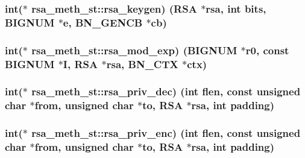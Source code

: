 \subsubsection[{\texorpdfstring{rsa\+\_\+keygen}{rsa_keygen}}]{\setlength{\rightskip}{0pt plus 5cm}int($\ast$ rsa\+\_\+meth\+\_\+st\+::rsa\+\_\+keygen) ({\bf R\+SA} $\ast$rsa, int {\bf bits}, {\bf B\+I\+G\+N\+UM} $\ast$e, {\bf B\+N\+\_\+\+G\+E\+N\+CB} $\ast${\bf cb})}\hypertarget{structrsa__meth__st_a08d964380b9ca4fd0d7664fe0d14dfd0}{}\label{structrsa__meth__st_a08d964380b9ca4fd0d7664fe0d14dfd0}
\subsubsection[{\texorpdfstring{rsa\+\_\+mod\+\_\+exp}{rsa_mod_exp}}]{\setlength{\rightskip}{0pt plus 5cm}int($\ast$ rsa\+\_\+meth\+\_\+st\+::rsa\+\_\+mod\+\_\+exp) ({\bf B\+I\+G\+N\+UM} $\ast$r0, const {\bf B\+I\+G\+N\+UM} $\ast$I, {\bf R\+SA} $\ast$rsa, {\bf B\+N\+\_\+\+C\+TX} $\ast$ctx)}\hypertarget{structrsa__meth__st_a055a4194b3a73d653111656553b2ae8c}{}\label{structrsa__meth__st_a055a4194b3a73d653111656553b2ae8c}
\subsubsection[{\texorpdfstring{rsa\+\_\+priv\+\_\+dec}{rsa_priv_dec}}]{\setlength{\rightskip}{0pt plus 5cm}int($\ast$ rsa\+\_\+meth\+\_\+st\+::rsa\+\_\+priv\+\_\+dec) (int flen, const unsigned char $\ast$from, unsigned char $\ast$to, {\bf R\+SA} $\ast$rsa, int padding)}\hypertarget{structrsa__meth__st_a0a9fcf9d1e4799ab69233c2187921fe1}{}\label{structrsa__meth__st_a0a9fcf9d1e4799ab69233c2187921fe1}
\subsubsection[{\texorpdfstring{rsa\+\_\+priv\+\_\+enc}{rsa_priv_enc}}]{\setlength{\rightskip}{0pt plus 5cm}int($\ast$ rsa\+\_\+meth\+\_\+st\+::rsa\+\_\+priv\+\_\+enc) (int flen, const unsigned char $\ast$from, unsigned char $\ast$to, {\bf R\+SA} $\ast$rsa, int padding)}\hypertarget{structrsa__meth__st_abb623f4c63d15a39af63ec2ead7cf803}{}\label{structrsa__meth__st_abb623f4c63d15a39af63ec2ead7cf803}
